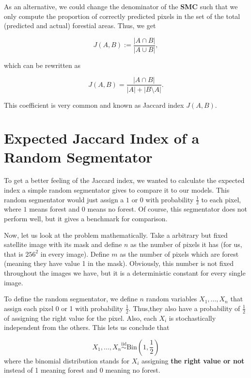As an alternative, we could change the denominator of the \textbf{SMC} such that we only compute the proportion of correctly predicted pixels in the set of the total (predicted and actual) forestial areas. Thus, we get

\begin{equation}
	J(A, B) := \frac{|A \cap B|}{|A \cup B|},
\end{equation}

which can be rewritten as

\begin{equation}
	J(A, B) = \frac{|A \cap B|}{|A| + |B \setminus A |}.
\end{equation}

This coefficient is very common and known as Jaccard index $J(A,B)$.\\

\section{Expected Jaccard Index of a Random Segmentator}
To get a better feeling of the Jaccard index, we wanted to calculate the expected index a simple random segmentator gives to compare it to our models. This random segmentator would just assign a $1$ or $0$ with probability $\frac{1}{2}$ to each pixel, where $1$ means forest and $0$ means no forest. Of course, this segmentator does not perform well, but it gives a benchmark for comparison.

Now, let us look at the problem mathematically. Take a arbitrary but fixed satellite image with its mask and define $n$ as the number of pixels it has (for us, that is $256^2$ in every image). Define $m$ as the number of pixels which are forest (meaning they have value 1 in the mask). Obviously, this number is not fixed throughout the images we have, but it is a deterministic constant for every single image.

To define the random segmentator, we define $n$ random variables $X_1, \dots, X_n$ that assign each pixel 0 or 1 with probability $\frac{1}{2}$. Thus,they also have a probability of $\frac{1}{2}$ of assigning the right value for the pixel. Also, each $X_i$ is stochastically independent from the others. This lets us conclude that

\begin{equation}
  X_1, \dots, X_n \overset{\mathrm{iid}}{\sim} \text{Bin}(1, \frac{1}{2})
\end{equation}
where the binomial distribution stands for $X_i$ assigning \textbf{the right value or not} instead of 1 meaning forest and 0 meaning no forest.

